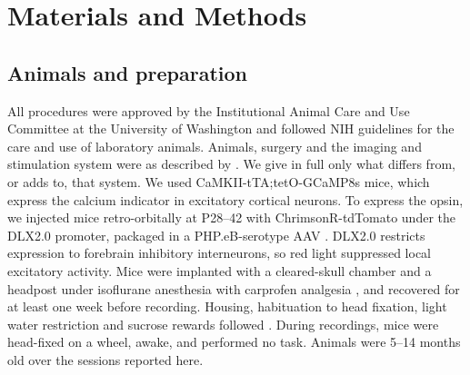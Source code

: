 
\section*{Materials and Methods}

\subsection*{Animals and preparation}

All procedures were approved by the Institutional Animal Care and Use Committee at the University of Washington and followed NIH guidelines for the care and use of laboratory animals.
Animals, surgery and the imaging and stimulation system were as described by \citet{Matveev2024}.
We give in full only what differs from, or adds to, that system.
We used CaMKII-tTA;tetO-GCaMP8s mice, which express the calcium indicator in excitatory cortical neurons.
To express the opsin, we injected mice retro-orbitally at P28--42 with ChrimsonR-tdTomato under the DLX2.0 promoter, packaged in a PHP.eB-serotype AAV \citep{Matveev2024}.
DLX2.0 restricts expression to forebrain inhibitory interneurons, so red light suppressed local excitatory activity.
Mice were implanted with a cleared-skull chamber and a headpost under isoflurane anesthesia with carprofen analgesia \citep{Matveev2024}, and recovered for at least one week before recording.
Housing, habituation to head fixation, light water restriction and sucrose rewards followed \citet{Matveev2024}.
During recordings, mice were head-fixed on a wheel, awake, and performed no task.
Animals were 5--14 months old over the sessions reported here.

